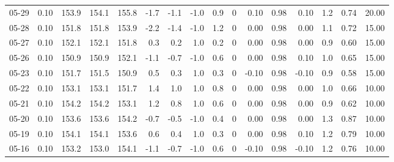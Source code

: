 \begin{threeparttable}
{\begin{tabular}{lrrrrrrrrrrrrrrr}
  05-29 &     0.10 & 153.9 & 154.1 & 155.8 &       -1.7 &           -1.1 &                     -1.0 &                 0.9 &              0 &       0.10 &      0.98 &           0.10 &              1.2 &            0.74 &                  20.00 \\
  05-28 &     0.10 & 151.8 & 151.8 & 153.9 &       -2.2 &           -1.4 &                     -1.0 &                 1.2 &              0 &       0.00 &      0.98 &           0.00 &              1.1 &            0.72 &                  15.00 \\
  05-27 &     0.10 & 152.1 & 152.1 & 151.8 &        0.3 &            0.2 &                      1.0 &                 0.2 &              0 &       0.00 &      0.98 &           0.00 &              0.9 &            0.60 &                  15.00 \\
  05-26 &     0.10 & 150.9 & 150.9 & 152.1 &       -1.1 &           -0.7 &                     -1.0 &                 0.6 &              0 &       0.00 &      0.98 &           0.10 &              1.0 &            0.65 &                  15.00 \\
  05-23 &     0.10 & 151.7 & 151.5 & 150.9 &        0.5 &            0.3 &                      1.0 &                 0.3 &              0 &      -0.10 &      0.98 &          -0.10 &              0.9 &            0.58 &                  15.00 \\
  05-22 &     0.10 & 153.1 & 153.1 & 151.7 &        1.4 &            1.0 &                      1.0 &                 0.8 &              0 &       0.00 &      0.98 &           0.00 &              1.0 &            0.66 &                  10.00 \\
  05-21 &     0.10 & 154.2 & 154.2 & 153.1 &        1.2 &            0.8 &                      1.0 &                 0.6 &              0 &       0.00 &      0.98 &           0.00 &              0.9 &            0.62 &                  10.00 \\
  05-20 &     0.10 & 153.6 & 153.6 & 154.2 &       -0.7 &           -0.5 &                     -1.0 &                 0.4 &              0 &       0.00 &      0.98 &           0.00 &              1.3 &            0.87 &                  10.00 \\
  05-19 &     0.10 & 154.1 & 154.1 & 153.6 &        0.6 &            0.4 &                      1.0 &                 0.3 &              0 &       0.00 &      0.98 &           0.10 &              1.2 &            0.79 &                  10.00 \\
  05-16 &     0.10 & 153.2 & 153.0 & 154.1 &       -1.1 &           -0.7 &                     -1.0 &                 0.6 &              0 &      -0.10 &      0.98 &          -0.10 &              1.2 &            0.76 &                  10.00 \\

\end{tabular}}
\end{threeparttable}
